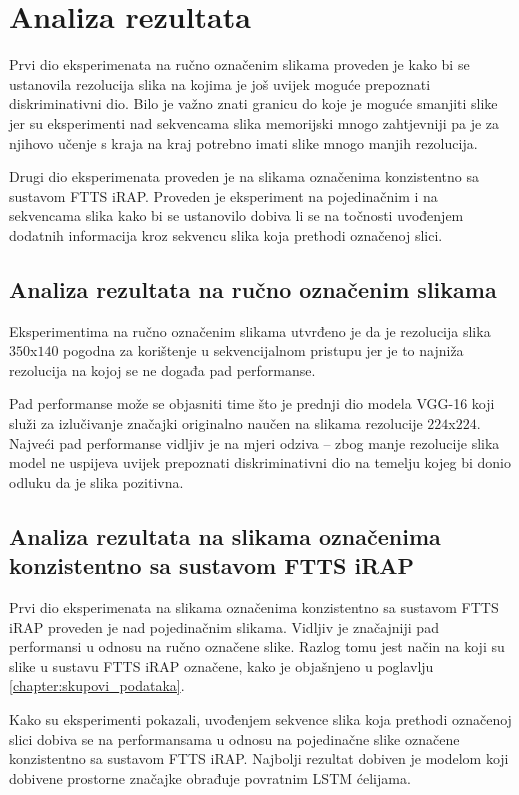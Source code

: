 \documentclass[times, utf8, diplomski, numeric]{fer}
\begin{document}
\section{Analiza rezultata}
Prvi dio eksperimenata na ručno označenim slikama proveden je kako bi se ustanovila rezolucija slika na kojima je još uvijek moguće prepoznati diskriminativni dio.
Bilo je važno znati granicu do koje je moguće smanjiti slike jer su eksperimenti nad sekvencama slika memorijski mnogo zahtjevniji pa je za njihovo učenje s kraja na kraj potrebno imati slike mnogo manjih rezolucija.

Drugi dio eksperimenata proveden je na slikama označenima konzistentno sa sustavom FTTS iRAP.
Proveden je eksperiment na pojedinačnim i na sekvencama slika kako bi se ustanovilo dobiva li se na točnosti uvođenjem dodatnih informacija kroz sekvencu slika koja prethodi označenoj slici.

\subsection{Analiza rezultata na ručno označenim slikama}
Eksperimentima na ručno označenim slikama utvrđeno je da je rezolucija slika $350$x$140$ pogodna za korištenje u sekvencijalnom pristupu jer je to najniža rezolucija na kojoj se ne događa pad performanse.

Pad performanse može se objasniti time što je prednji dio modela VGG-16 koji služi za izlučivanje značajki originalno naučen na slikama rezolucije $224$x$224$. 
Najveći pad performanse vidljiv je na mjeri odziva -- zbog manje rezolucije slika model ne uspijeva uvijek prepoznati diskriminativni dio na temelju kojeg bi donio odluku da je slika pozitivna.

\subsection{Analiza rezultata na slikama označenima konzistentno sa sustavom FTTS iRAP}
Prvi dio eksperimenata na slikama označenima konzistentno sa sustavom FTTS iRAP proveden je nad pojedinačnim slikama. 
Vidljiv je značajniji pad performansi u odnosu na ručno označene slike. 
Razlog tomu jest način na koji su slike u sustavu FTTS iRAP označene, kako je objašnjeno u poglavlju \ref{chapter:skupovi_podataka}.

Kako su eksperimenti pokazali, uvođenjem sekvence slika koja prethodi označenoj slici dobiva se na performansama u odnosu na pojedinačne slike označene konzistentno sa sustavom FTTS iRAP. 
Najbolji rezultat dobiven je modelom koji dobivene prostorne značajke obrađuje povratnim LSTM ćelijama.
\end{document}
